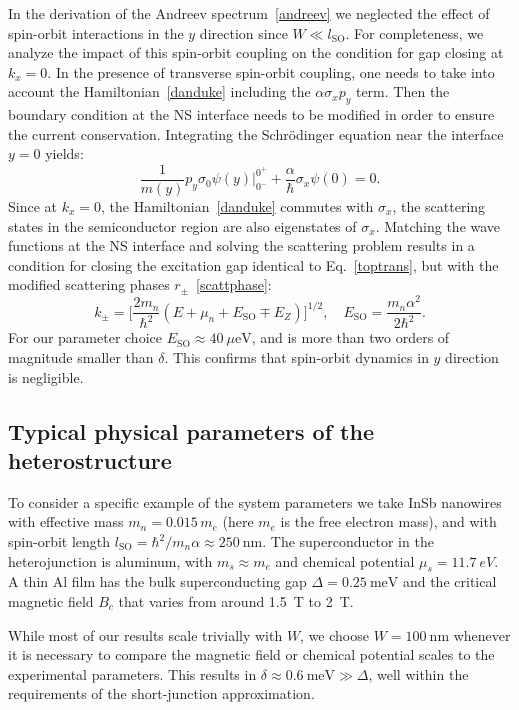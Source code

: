 In the derivation of the Andreev spectrum~\eqref{andreev} we neglected the effect of spin-orbit interactions in the $y$ direction since $W \ll l_\mathrm{SO}$.
For completeness, we analyze the impact of this spin-orbit coupling on the condition for gap closing at $k_x=0$.
In the presence of transverse spin-orbit coupling, one needs to take into account the Hamiltonian~\eqref{danduke} including the $\alpha\sigma_xp_y$ term.
Then the boundary condition at the NS interface needs to be modified in order to ensure the current conservation.
Integrating the Schr\"odinger equation near the interface $y=0$ yields:
\begin{equation}
\frac{1}{m(y)}p_y\sigma_0\psi(y)\bigg|_{0^-}^{0^+}
+\frac{\alpha}{\hbar}\sigma_x\psi(0)=0.
\end{equation}
Since at $k_x = 0$, the Hamiltonian~\eqref{danduke} commutes with $\sigma_x$, the scattering states in the semiconductor region are also eigenstates of $\sigma_x$.
Matching the wave functions at the NS interface and solving the scattering problem results in a condition for closing the excitation gap identical to Eq.~\eqref{toptrans}, but with the modified scattering phases $r_\pm$~\eqref{scattphase}:
\begin{equation}\label{kx_0}
k_\pm=\bigg[
\frac{2m_n}{\hbar^2}(E+\mu_n+E_\textrm{SO}\mp E_Z)
\bigg]^{1/2},\quad
E_\textrm{SO}=\frac{m_n\alpha^2}{2\hbar^2}.
\end{equation}
For our parameter choice $E_\textrm{SO}\approx\SI{40}{\mu \eV}$, and is more than two orders of magnitude smaller than $\delta$.
This confirms that spin-orbit dynamics in $y$ direction is negligible.

\subsection{Typical physical parameters of the heterostructure}
\label{sec:phys_params}
To consider a specific example of the system parameters we take InSb nanowires~\cite{Mourik2012} with effective mass $m_n=0.015\,m_e$ (here $m_e$ is the free electron mass), and with spin-orbit length $l_\mathrm{SO}=\hbar^2/m_n\alpha\approx \SI{250}{\nm}$.
The superconductor in the heterojunction is aluminum, with $m_s \approx m_e$ and chemical potential $\mu_s=\SI{11.7}{eV}$.
A thin Al film has the bulk superconducting gap $\Delta=\SI{0.25}{\meV}$ and the critical magnetic field $B_c$ that varies from around \SI{1.5}{T} to \SI{2}{T}.

While most of our results scale trivially with $W$, we choose $W=\SI{100}{\nm}$ whenever it is necessary to compare the magnetic field or chemical potential scales to the experimental parameters.
This results in $\delta \approx \SI{0.6}{\meV} \gg \Delta$, well within the requirements of the short-junction approximation.


